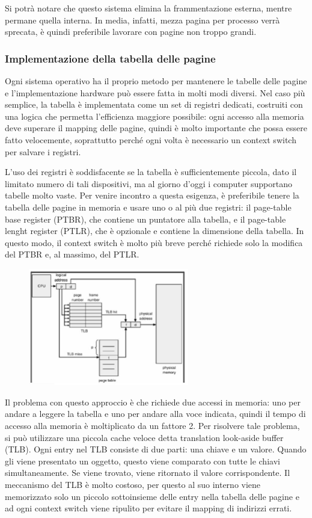\documentclass[a4paper]{article}
\begin{document}
Si potrà notare che questo sistema elimina la frammentazione esterna, mentre permane quella interna. In media, infatti, mezza pagina per processo verrà sprecata, è quindi preferibile lavorare con pagine non troppo grandi.

\subsubsection{Implementazione della tabella delle pagine}
Ogni sistema operativo ha il proprio metodo per mantenere le tabelle delle pagine e l'implementazione hardware può essere fatta in molti modi diversi. Nel caso più semplice, la tabella è implementata come un set di registri dedicati, costruiti con una logica che permetta l'efficienza maggiore possibile: ogni accesso alla memoria deve superare il mapping delle pagine, quindi è molto importante che possa essere fatto velocemente, soprattutto perché ogni volta è necessario un context switch per salvare i registri.

L'uso dei registri è soddisfacente se la tabella è sufficientemente piccola, dato il limitato numero di tali dispositivi, ma al giorno d'oggi i computer supportano tabelle molto vaste. Per venire incontro a questa esigenza, è preferibile tenere la tabella delle pagine in memoria e usare uno o al più due registri: il page-table base register (PTBR), che contiene un puntatore alla tabella, e il page-table lenght register (PTLR), che è opzionale e contiene la dimensione della tabella. In questo modo, il context switch è molto più breve perché richiede solo la modifica del PTBR e, al massimo, del PTLR.

\begin{figure}
    \includegraphics[width=7cm]{img/tlb.JPG}
\end{figure}
Il problema con questo approccio è che richiede due accessi in memoria: uno per andare a leggere la tabella e uno per andare alla voce indicata, quindi il tempo di accesso alla memoria è moltiplicato da un fattore 2. Per risolvere tale problema, si può utilizzare una piccola cache veloce detta translation look-aside buffer (TLB). Ogni entry nel TLB consiste di due parti: una chiave e un valore.  Quando gli viene presentato un oggetto, questo viene comparato con tutte le chiavi simultaneamente. Se viene trovato, viene ritornato il valore corrispondente.
Il meccanismo del TLB è molto costoso, per questo al suo interno viene memorizzato solo un piccolo sottoinsieme delle entry nella tabella delle pagine e ad ogni context switch viene ripulito per evitare il mapping di indirizzi errati.
\end{document}
